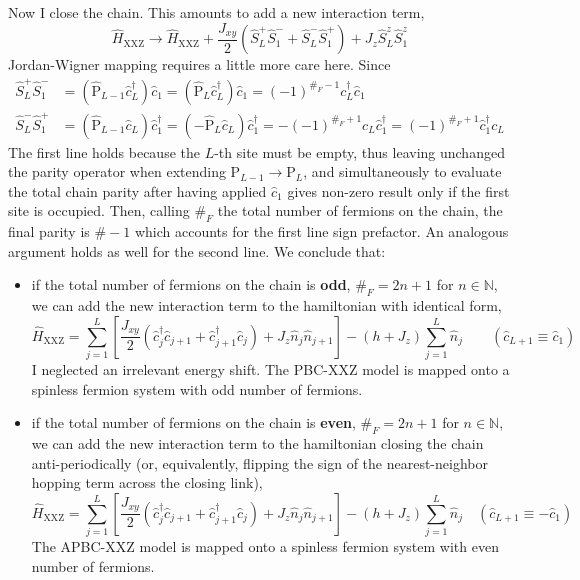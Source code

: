 Now I close the chain. This amounts to add a new interaction term,
\[
	\hat H_\mathrm{XXZ} \to \hat H_\mathrm{XXZ} + \frac{J_{xy}}{2} \left( 
		\hat S_L^+ \hat S_1^- + \hat S_L^- \hat S_1^+
	\right) + J_z \hat S_L^z \hat S_1^z
\]
Jordan-Wigner mapping requires a little more care here. Since
\[
	\begin{aligned}
		\hat S_L^+ \hat S_1^- &= \left(
			\hat{\mathrm{P}}_{L-1} \hat c_L^\dagger
		\right) \hat c_1 = \left(
			\hat{\mathrm{P}}_L \hat c_L^\dagger
		\right) \hat c_1 = (-1)^{\#_F -1} c_L^\dagger \hat c_1 \\
		\hat S_L^- \hat S_1^+ &= \left(
			\hat{\mathrm{P}}_{L-1} \hat c_L
		\right) \hat c_1^\dagger = \left(
			-\hat{\mathrm{P}}_L \hat c_L
		\right) \hat c_1^\dagger = -(-1)^{\#_F+1} c_L \hat c_1^\dagger = (-1)^{\#_F+1} \hat c_1^\dagger c_L
	\end{aligned}
\]
The first line holds because the $L$-th site must be empty, thus leaving unchanged the parity operator when extending $\mathrm{P}_{L-1} \to \mathrm{P}_L$, and simultaneously to evaluate the total chain parity after having applied $\hat c_1$ gives non-zero result only if the first site is occupied. Then, calling $\#_F$ the total number of fermions on the chain, the final parity is $\#-1$ which accounts for the first line sign prefactor. An analogous argument holds as well for the second line. We conclude that:
\begin{itemize}
	\item if the total number of fermions on the chain is \textbf{odd}, $\#_F = 2n+1$ for $n \in \mathbb{N}$, we can add the new interaction term to the hamiltonian with identical form,
	\begin{equation}\label{eq:xxz-hamiltonian-intermediate}
		\hat H_\mathrm{XXZ} = \sum_{j=1}^L \left[
			\frac{J_{xy}}{2} \left(
				\hat c_j^\dagger \hat c_{j+1} + \hat c_{j+1}^\dagger \hat c_j
			\right) + J_z \hat n_j \hat n_{j+1}
		\right] - (h+J_z) \sum_{j=1}^L \hat n_{j}
		\qquad
		\left(
			\hat c_{L+1} \equiv \hat c_1
		\right)
	\end{equation}
	I neglected an irrelevant energy shift. The PBC-$\mathrm{XXZ}$ model is mapped onto a spinless fermion system with odd number of fermions.
	\item if the total number of fermions on the chain is \textbf{even}, $\#_F = 2n+1$ for $n \in \mathbb{N}$, we can add the new interaction term to the hamiltonian closing the chain anti-periodically (or, equivalently, flipping the sign of the nearest-neighbor hopping term across the closing link),
	\[
		\hat H_\mathrm{XXZ} = \sum_{j=1}^L \left[
		\frac{J_{xy}}{2} \left(
				\hat c_j^\dagger \hat c_{j+1} + \hat c_{j+1}^\dagger \hat c_j
			\right) + J_z \hat n_j \hat n_{j+1}
		\right] - (h+J_z) \sum_{j=1}^L \hat n_{j}
		\quad
		\left(
			\hat c_{L+1} \equiv - \hat c_1
		\right)
	\]
	The APBC-$\mathrm{XXZ}$ model is mapped onto a spinless fermion system with even number of fermions.
\end{itemize}
